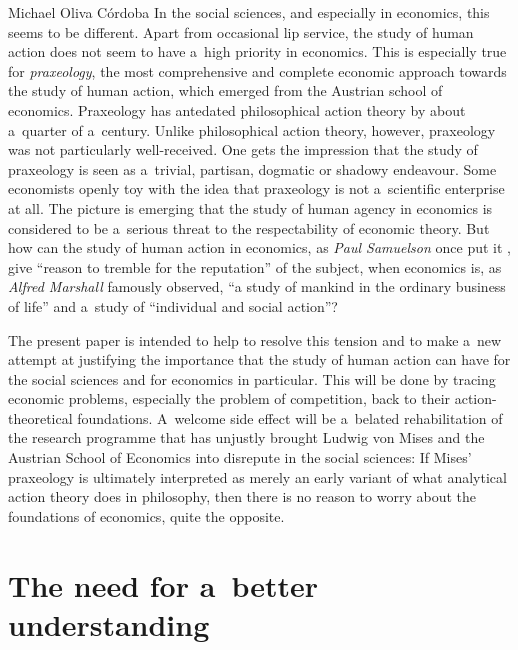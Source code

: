 \begin{artengenv}{Michael Oliva Córdoba}
In the social sciences, and especially in economics, this seems to be different. Apart from occasional lip service, the study of human action does not seem to have a~high priority in economics. This is especially true for \textit{praxeology}, the most comprehensive and complete economic approach towards the study of human action, which emerged from the Austrian school of economics. Praxeology has antedated philosophical action theory by about a~quarter of a~century. Unlike philosophical action theory, however, praxeology was not particularly well-received. One gets the impression that the study of praxeology is seen as a~trivial, partisan, dogmatic or shadowy endeavour. Some economists openly toy with the idea that praxeology is not a~scientific enterprise at all. The picture is emerging that the study of human agency in economics is considered to be a~serious threat to the respectability of economic theory. But how can the study of human action in economics, as \textit{Paul Samuelson} once put it 
\parencite*[][p.736]{samuelson_theory_1964}, %
 give ``reason to tremble for the reputation'' of the subject, when economics is, as \textit{Alfred Marshall} 
\parencite*[][p.1]{marshall_principles_1890} %
 famously observed, ``a study of mankind in the ordinary business of life'' and a~study of ``individual and social action''?



The present paper is intended to help to resolve this tension and to make a~new attempt at justifying the importance that the study of human action can have for the social sciences and for economics in particular. This will be done by tracing economic problems, especially the problem of competition, back to their action-theoretical foundations. A~welcome side effect will be a~belated rehabilitation of the research programme that has unjustly brought Ludwig von Mises and the Austrian School of Economics into disrepute in the social sciences: If Mises' praxeology is ultimately interpreted as merely an early variant of what analytical action theory does in philosophy, then there is no reason to worry about the foundations of economics, quite the opposite.



\section{The need for a~better understanding}


\end{artengenv}

